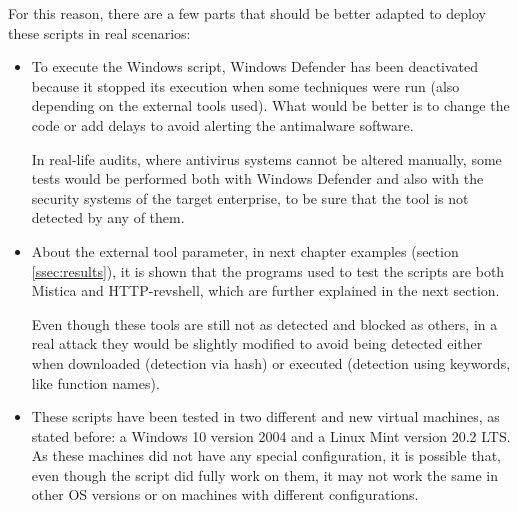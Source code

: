 For this reason, there are a few parts that should be better adapted to deploy these scripts in real scenarios:
\begin{itemize}
\item To execute the Windows script, Windows Defender has been deactivated because it stopped its execution when some techniques were run (also depending on the external tools used). What would be better is to change the code or add delays to avoid alerting the antimalware software.

In real-life audits, where antivirus systems cannot be altered manually, some tests would be performed both with Windows Defender and also with the security systems of the target enterprise, to be sure that the tool is not detected by any of them.

\item About the external tool parameter, in next chapter examples (section \ref{ssec:results}), it is shown that the programs used to test the scripts are both Mistica\cite{Mistica} and HTTP-revshell\cite{HTTPRevshell}, which are further explained in the next section. 

Even though these tools are still not as detected and blocked as others, in a real attack they would be slightly modified to avoid being detected either when downloaded (detection via hash) or executed (detection using keywords, like function names).

\item These scripts have been tested in two different and new virtual machines, as stated before: a Windows 10 version 2004 and a Linux Mint version 20.2 LTS. As these machines did not have any special configuration, it is possible that, even though the script did fully work on them, it may not work the same in other OS versions or on machines with different configurations.

\end{itemize}